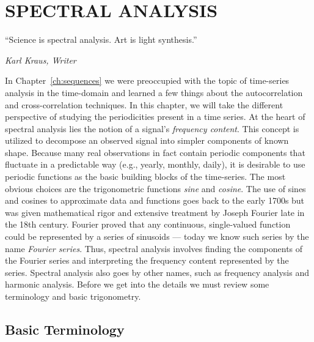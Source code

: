 %
\chapter{SPECTRAL ANALYSIS}
\label{ch:spectralanallysis}
\epigraph{``Science is spectral analysis. Art is light synthesis.''}{\textit{Karl Kraus, Writer}}

	In Chapter~\ref{ch:sequences} we were preoccupied with the topic of time-series analysis in the time-domain 
and learned a few things about the autocorrelation and cross-correlation techniques.  
In this chapter, we will take the different perspective of studying the periodicities present in a time 
series.
	At the heart of spectral analysis lies the notion of a signal's \emph{frequency content}.  This concept is 
utilized to decompose an observed signal into simpler components of known shape.  Because many real 
observations in fact contain periodic components that fluctuate in a predictable way (e.g., yearly, monthly, 
daily), it is desirable to use periodic functions as the basic building blocks of the time-series.  
The most obvious choices are the trigonometric functions \emph{sine} and \emph{cosine}.
	The use of sines and cosines to approximate data and functions goes back to the early 1700s 
but was given mathematical rigor and extensive treatment by Joseph Fourier late in the 18th century.  
Fourier proved that any continuous, single-valued function could be represented by a series of 
sinusoids --- today we know such series by the name \emph{Fourier series}.  Thus, spectral analysis 
involves finding the components of the Fourier series and interpreting the frequency content 
represented by the series.  Spectral analysis also goes by other names, such as frequency analysis and 
harmonic analysis.  Before we get into the details we must review some terminology and basic 
trigonometry.

\section{Basic Terminology}

